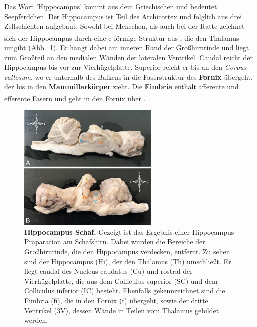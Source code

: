 Das Wort 'Hippocampus' kommt aus dem Griechischen und bedeutet Seepferdchen. Der Hippocampus ist Teil des Archicortex und folglich aus drei Zellschichten aufgebaut. Sowohl bei Menschen, als auch bei der Ratte zeichnet sich der Hippocampus durch eine c-förmige Struktur aus \textsuperscript{\cite[Kap.~20]{paxinos2014rat}}, die den Thalamus umgibt (Abb.~\ref{fig:hippocampus_schaf}). Er hängt dabei am inneren Rand der Großhirnrinde und liegt zum Großteil an den medialen Wänden der lateralen Ventrikel. Caudal reicht der Hippocampus bis vor zur Vierhügelplatte. Superior reicht er bis an den \textit{Corpus callosum}, wo er unterhalb des Balkens in die Faserstruktur des \textbf{Fornix} übergeht, der bis in den \textbf{Mammillarkörper} zieht. Die \textbf{Fimbria} enthält afferente und efferente Fasern und geht in den Fornix über \textsuperscript{\cite[Kap.~9]{trepel2011neuroanatomie}}.\\

\begin{figure}[H]
    \centering
    \includegraphics[width=0.6\textwidth]{pictures/Bilder_Jule/Schaf/Ausschnitte/hippocampus_schaf.png}
    \caption[Hippocampus Schaf]{\textbf{Hippocampus Schaf.} Gezeigt ist das Ergebnis einer Hippocampus-Präparation am Schafshirn. Dabei wurden die Bereiche der Großhirnrinde, die den Hippocampus verdecken, entfernt. Zu sehen sind der Hippocampus (Hi), der den Thalamus (Th) umschließt. Er liegt caudal des Nucleus caudatus (Cu) und rostral der Vierhügelplatte, die aus dem Colliculus superior (SC) und dem Colliculus inferior (IC) besteht. Ebenfalls gekennzeichnet sind die Fimbria (fi), die in den Fornix (f) übergeht, sowie der dritte Ventrikel (3V), dessen Wände in Teilen vom Thalamus gebildet werden.}
    \label{fig:hippocampus_schaf}
\end{figure}{}

